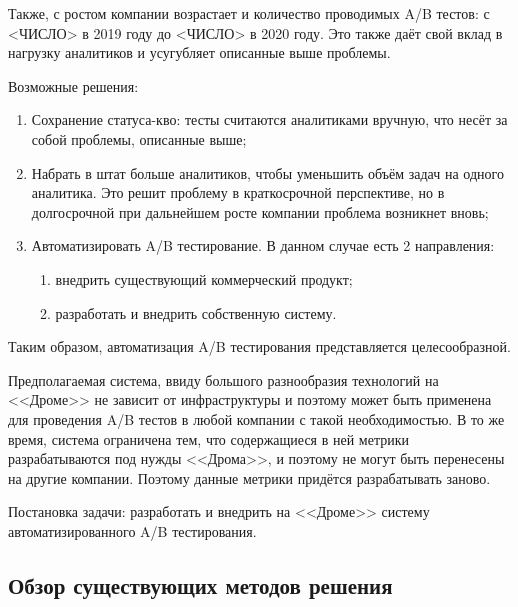 \documentclass[../document.tex]{subfiles}
\begin{document}
	\par Также, с ростом компании возрастает и количество проводимых A/B тестов: с <ЧИСЛО> в 2019 году до <ЧИСЛО> в 2020 году. Это также даёт свой вклад в нагрузку аналитиков и усугубляет описанные выше проблемы.
	\par Возможные решения:
	\begin{enumerate}
		\item Сохранение статуса-кво: тесты считаются аналитиками вручную, что несёт за собой проблемы, описанные выше;
		\item Набрать в штат больше аналитиков, чтобы уменьшить объём задач на одного аналитика. Это решит проблему в краткосрочной перспективе, но в долгосрочной при дальнейшем росте компании проблема возникнет вновь;
		\item Автоматизировать A/B тестирование. В данном случае есть 2 направления:
		\begin{enumerate}
			\item внедрить существующий коммерческий продукт;
			\item разработать и внедрить собственную систему.
		\end{enumerate}
	\end{enumerate}
	\par Таким образом, автоматизация A/B тестирования представляется целесообразной.
	\par Предполагаемая система, ввиду большого разнообразия технологий на <<Дроме>> не зависит от инфраструктуры и поэтому может быть применена для проведения A/B тестов в любой компании с такой необходимостью. В то же время, система ограничена тем, что содержащиеся в ней метрики разрабатываются под нужды <<Дрома>>, и поэтому не могут быть перенесены на другие компании. Поэтому данные метрики придётся разрабатывать заново.
	\par Постановка задачи: разработать и внедрить на <<Дроме>> систему автоматизированного A/B тестирования.
	\subsection{Обзор существующих методов решения}
\end{document}
